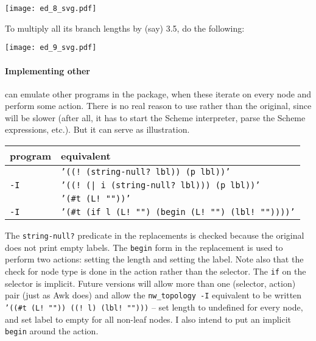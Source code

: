 
\begin{center}
\texttt{[image: ed\_8\_svg.pdf]}
\end{center}

To multiply all its branch lengths by (say) 3.5, do the following:


\begin{center}
\texttt{[image: ed\_9\_svg.pdf]}
\end{center}

\begin{samepage}
\paragraph{Implementing other \nutils}

\noindent{}\sched{} can emulate other programs in the package, when these
iterate on every node and perform some action. There is no real reason to use
\sched{} rather than the original, since \sched{} will be slower (after all, it
has to start the Scheme interpreter, parse the Scheme expressions, etc.). But it
can serve as illustration.
\end{samepage}

\begin{center}
\begin{tabular}{ll}
program & \sched{} equivalent \\
\hline
{}{} 						& {\tt '((! (string-null? lbl)) (p lbl))'}  \\
{} {\tt -I} 		& {\tt '((! (| i (string-null? lbl))) (p lbl))'} \\
\topology{}						& {\tt '(\#t (L! ""))'} \\
\topology{} {\tt -I} 	& {\tt '(\#t (if l (L! "") (begin (L! "") (lbl!  ""))))'}
\end{tabular}
\end{center}

The {\tt string-null?} predicate in the  replacements is checked
because the original  does not print empty labels. The {\tt begin} form
in the \topology{} replacement is used to perform two actions: setting the
length and setting the label. Note also that the check for node type is done in
the action rather than the selector. The {\tt if} on the selector is implicit.
Future versions will allow more than one (selector, action) pair (just as Awk
does) and allow the {\tt nw\_topology -I} equivalent to be written {\tt '((\#t
(L! "")) ((! l) (lbl! "")))} -- set length to undefined for every node, and set
label to empty for all non-leaf nodes. I also intend to put an implicit {\tt
begin} around the action.
